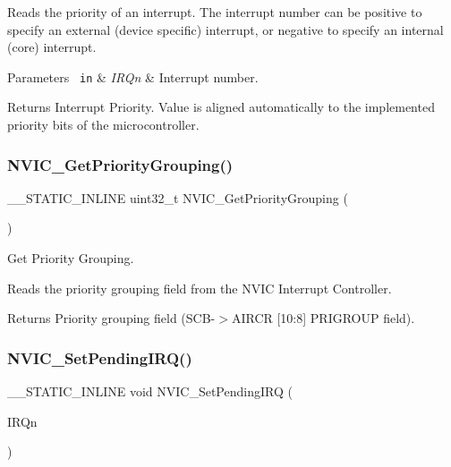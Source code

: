 Reads the priority of an interrupt. The interrupt number can be positive to specify an external (device specific) interrupt, or negative to specify an internal (core) interrupt. 
\begin{DoxyParams}[1]{Parameters}
\mbox{\texttt{ in}}  & {\em I\+R\+Qn} & Interrupt number. \\
\hline
\end{DoxyParams}
\begin{DoxyReturn}{Returns}
Interrupt Priority. Value is aligned automatically to the implemented priority bits of the microcontroller. 
\end{DoxyReturn}
\mbox{\label{group__CMSIS__Core__NVICFunctions_ga394f7ce2ca826c0da26284d17ac6524d}} 
\subsubsection{\texorpdfstring{NVIC\_GetPriorityGrouping()}{NVIC\_GetPriorityGrouping()}}
{\footnotesize\ttfamily \+\_\+\+\_\+\+S\+T\+A\+T\+I\+C\+\_\+\+I\+N\+L\+I\+NE uint32\+\_\+t N\+V\+I\+C\+\_\+\+Get\+Priority\+Grouping (\begin{DoxyParamCaption}\item[{void}]{ }\end{DoxyParamCaption})}



Get Priority Grouping. 

Reads the priority grouping field from the N\+V\+IC Interrupt Controller. \begin{DoxyReturn}{Returns}
Priority grouping field (S\+C\+B-\/$>$A\+I\+R\+CR \mbox{[}10\+:8\mbox{]} P\+R\+I\+G\+R\+O\+UP field). 
\end{DoxyReturn}
\mbox{\label{group__CMSIS__Core__NVICFunctions_ga3ecf446519da33e1690deffbf5be505f}} 
\subsubsection{\texorpdfstring{NVIC\_SetPendingIRQ()}{NVIC\_SetPendingIRQ()}}
{\footnotesize\ttfamily \+\_\+\+\_\+\+S\+T\+A\+T\+I\+C\+\_\+\+I\+N\+L\+I\+NE void N\+V\+I\+C\+\_\+\+Set\+Pending\+I\+RQ (\begin{DoxyParamCaption}\item[{\mbox{\hyperlink{group__SAME70J19__cmsis_gac3af4a32370fb28c4ade8bf2add80251}{I\+R\+Qn\+\_\+\+Type}}}]{I\+R\+Qn }\end{DoxyParamCaption})}



